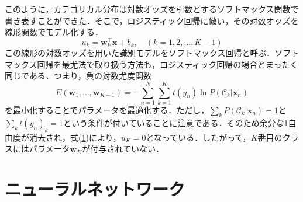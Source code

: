 \documentclass[a4paper,11pt]{jsreport}
\begin{document}
このように，カテゴリカル分布は対数オッズを引数とするソフトマックス関数で書き表すことができた．そこで，ロジスティック回帰に倣い，その対数オッズを線形関数でモデル化する．
\begin{equation}
  u_k = \bm{w}_k^{\top} \bm{x} + b_k, \quad (k = 1,2,\dots,K-1)
\end{equation}
この線形の対数オッズを用いた識別モデルをソフトマックス回帰と呼ぶ．ソフトマックス回帰を最尤法で取り扱う方法も，ロジスティック回帰の場合とまったく同じである．つまり，負の対数尤度関数
\begin{equation}
  E(\bm{w}_1,\dots,\bm{w}_{K-1})
  = -\sum_{n=1}^{N}\sum_{k=1}^{K} t(y_n) \ln{P(\mathcal{C}_k | \bm{x}_n)}
\end{equation}
を最小化することでパラメータを最適化する．ただし，$\sum_{k} P(\mathcal{C}_k | \bm{x}_n) = 1$と$\sum_{k} t(y_n)_k = 1$という条件が付いていることに注意である．そのため余分な1自由度が消去され，式(\ref{})により，$u_K=0$となっている．したがって，$K$番目のクラスにはパラメータ$\bm{w}_K$が付与されていない．


\section{ニューラルネットワーク}
\end{document}
